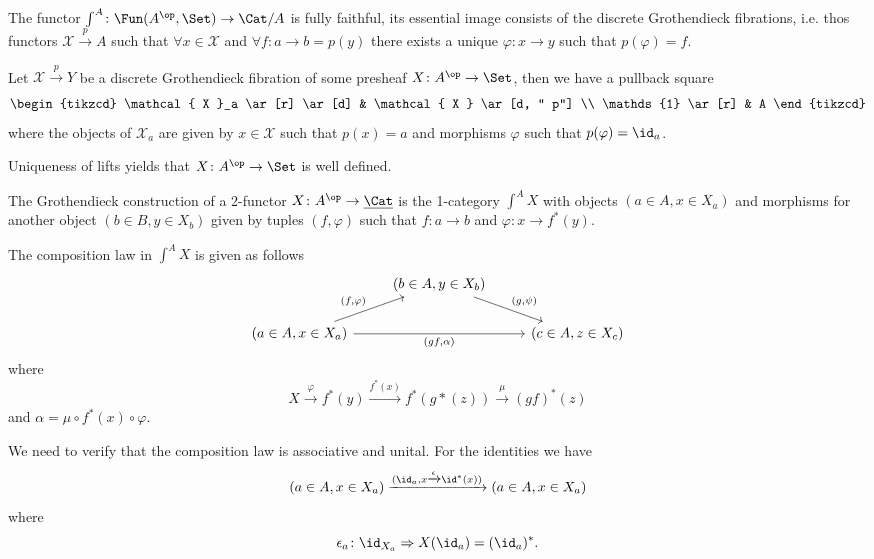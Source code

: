 \begin{thm}
	The functor $ \int^A \colon \Fun ( A^{ \op } , \Set ) \to \Cat/A $ is fully faithful,
	its essential image consists of the discrete Grothendieck fibrations, i.e. thos functors 
	$ \mathcal{ X } \xrightarrow{ p } A $ such that $ \forall x \in \mathcal{X} $ and $ \forall f \colon a \to b = p ( y) $ there exists a unique $ \varphi \colon x \to y  $ such that $ p( \varphi ) = f $.
\end{thm} 

\begin{Idea}
	Let $ \mathcal{X} \xrightarrow{ p } Y $ be a discrete Grothendieck fibration of some presheaf $ X \colon A^{ \op } \to \Set $, then we have a pullback square
	\[
	\begin{tikzcd}
		\mathcal{ X }_a 
		\ar[r]
		\ar[d]
		&
		\mathcal{ X }
		\ar[d, " p"]
		\\
		\mathds{1}
		\ar[r]
		&
		A
	\end{tikzcd}
	\]
	where the objects of $ \mathcal{ X }_a $ are given by $ x \in \mathcal{ X } $ such that $ p ( x ) = a $ and morphisms $ \varphi $ such that $ p ( \varphi ) = \id_a $.
	
	
	Uniqueness of lifts yields that $ X \colon A ^{ \op } \to \Set $ is well defined.
\end{Idea}

\begin{defi}
	The Grothendieck construction of a 2-functor $ X \colon A^{ \op } \to \underline{\Cat} $ is the 1-category $ \int^A X $ with objects $ ( a \in A , x \in X_a ) $ and morphisms for another object $ ( b \in B , y \in X_b )$ given by tuples $ ( f , \varphi ) $ such that $ f \colon a \to b $ and $ \varphi \colon x \to f^* ( y ) $.
	
	The composition law in $ \int^A X $ is given as follows
	\[
	\begin{tikzcd}	
		&
		( b \in A , y \in X_b )
		\ar[rd, "{ ( g , \psi ) }"]
		&
		\\
		(a \in A , x \in X_a )
		\ar[ru, "{ ( f , \varphi ) }"]
		\ar[rr, "{ ( gf , \alpha ) }"']
		&&
		( c \in A , z \in X_c )
	\end{tikzcd}
	\]
	where
	\[
		X \xrightarrow{ \varphi } f^* ( y ) \xrightarrow{ f^* ( x ) } f^* ( g* ( z )) \xrightarrow{ \mu } ( gf )^*( z )
	\] 
	and $ \alpha = \mu \circ f^*( x ) \circ \varphi $.
\end{defi}

We need to verify that the composition law is associative and unital.
For the identities we have 
\[
	( a \in A , x \in X_a ) \xrightarrow{ ( \id_a , x \xrightarrow{ \epsilon } \id^* ( x ) ) } ( a \in A , x \in X_a ) 
\] 
where 
\[
	\epsilon_a \colon \id_{X_a } \Rightarrow X ( \id_a ) = ( \id_a )^*.
\]

